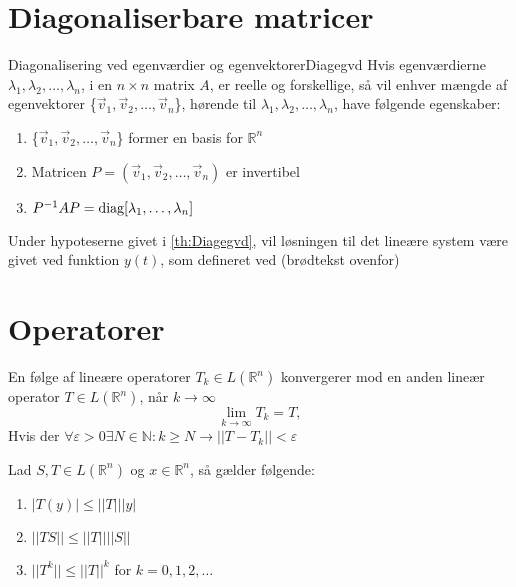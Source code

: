 \section{Diagonaliserbare matricer}

\begin{mytheo}{Diagonalisering ved egenværdier og egenvektorer}{Diagegvd}
Hvis egenværdierne $\lambda_1, \lambda_2, \hdots, \lambda_n$, i en $n\times n$ matrix $A$, er reelle og forskellige, så vil enhver mængde af egenvektorer \{$\vec v_1, \vec v_2, \hdots, \vec v_n$\}, hørende til $\lambda_1, \lambda_2, \hdots, \lambda_n$, have følgende egenskaber:
\hfill \break
\begin{enumerate}
    \item \{$\vec v_1, \vec v_2, \hdots, \vec v_n$\} former en basis for $\mathbb{R}^n$
    \item Matricen $P = (\vec v_1, \vec v_2, \hdots, \vec v_n)$ er invertibel
    \item $P^{-1}AP = \textnormal{diag}[\lambda_1, \hdots, \lambda_n]$
\end{enumerate}

\end{mytheo}

\begin{koro}{}{}
Under hypoteserne givet i \ref{th:Diagegvd}, vil løsningen til det lineære system være givet ved funktion $y(t)$, som defineret ved (brødtekst ovenfor)
\end{koro}

\section{Operatorer}

\begin{definition}
En følge af lineære operatorer $T_k \in L(\mathbb{R}^n)$ konvergerer mod en anden lineær operator $T \in L(\mathbb{R}^n)$, når $k \to \infty$
$$\lim_{k\to\infty} T_k = T,$$
Hvis der $\forall \varepsilon > 0 \exists N \in \mathbb{N}: k \geq N \to ||T - T_k|| < \varepsilon$
\end{definition}

\begin{lemma}{}{}
Lad $S,T \in L(\mathbb{R}^n)$ og $x \in \mathbb{R}^n$, så gælder følgende:
\begin{enumerate}
    \item $|T(y)| \leq ||T|| |y|$
    \item $||TS|| \leq ||T|| ||S||$
    \item $||T^k|| \leq ||T||^k$ for $k = 0,1,2, \hdots$
\end{enumerate}
\end{lemma}
